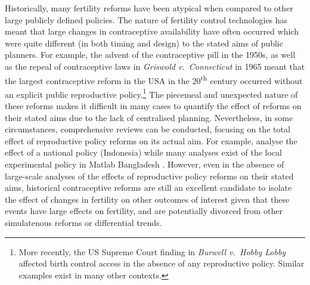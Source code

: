 \documentclass{article}
\begin{document}
\begin{spacing}{1.4}
Historically, many fertility reforms have been atypical when compared to other 
large publicly defined policies.  The nature of fertility control technologies 
has meant that large changes in contraceptive availability have often occurred
which were quite different (in both timing and design) to the stated aims of
public planners.  For example, the advent of the contraceptive pill in the 
1950s, as well as the repeal of contraceptive laws in \emph{Griswold v.\ 
Connecticut} in 1965 \citep{Bailey2013} meant that the largest contraceptive 
reform in the USA in the 20\textsuperscript{th} century occurred without an 
explicit public reproductive policy.\footnote{More recently, the US Supreme 
Court finding in \emph{Burwell v.\ Hobby Lobby} affected birth control access 
in the absence of any reproductive policy.  Similar examples exist in many other 
contexts.} The piecemeal and unexpected nature of these reforms makes it
difficult in many cases to quantify the effect of reforms on their stated aims
due to the
lack of centralised planning. Nevertheless, in some circumstances, comprehensive
reviews can be conducted, focusing on the total effect of reproductive policy
reforms on its actual aim.  For example, \citet{MolyneuxGertler2000} analyse 
the effect of a national policy (Indonesia) while many analyses exist of the 
local experimental policy in Matlab Bangladesh \citep{JoshiSchultz2013}. However,
even in the absence of large-scale analyses of the effects of reproductive policy 
reforms on their stated aims, historical contraceptive reforms are still an 
excellent candidate to isolate the effect of changes in fertility on other
outcomes of interest given that these events have large effects on fertility,
and are potentially divorced from other simulatenous reforms or differential 
trends.


\end{spacing}
\end{document}
